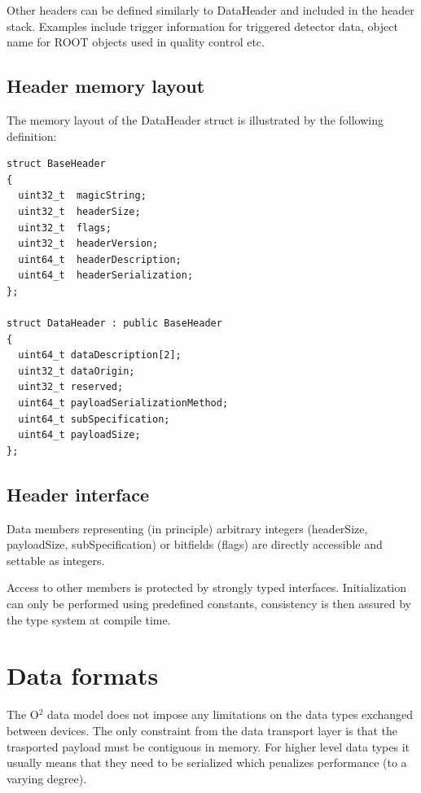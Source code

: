 \documentclass[a4paper,twoside]{article}
\def\O2{O$^2$}
\begin{document}
Other headers can be defined similarly to DataHeader and included in the header stack. Examples include trigger information for triggered detector data, object name for ROOT objects used in quality control etc.

\subsection{Header memory layout}
The memory layout of the DataHeader struct is illustrated by the following definition:

\lstset{language=C++
}
\begin{lstlisting}
struct BaseHeader
{
  uint32_t  magicString;
  uint32_t  headerSize;
  uint32_t  flags;
  uint32_t  headerVersion;
  uint64_t  headerDescription;
  uint64_t  headerSerialization;
};

struct DataHeader : public BaseHeader
{
  uint64_t dataDescription[2];
  uint32_t dataOrigin;
  uint32_t reserved;
  uint64_t payloadSerializationMethod;
  uint64_t subSpecification;
  uint64_t payloadSize;
};

\end{lstlisting}

\subsection{Header interface}

Data members representing (in principle) arbitrary integers (headerSize, payloadSize, subSpecification) or bitfields (flags) are directly accessible and settable as integers.

Access to other members is protected by strongly typed interfaces. Initialization can only be performed using predefined constants, consistency is then assured by the type system at compile time.

\section{Data formats}

The \O2 data model does not impose any limitations on the data types exchanged between devices. The only constraint from the data transport layer is that the trasported payload must be contiguous in memory. For higher level data types it usually means that they need to be serialized which penalizes performance (to a varying degree).
\end{document}
